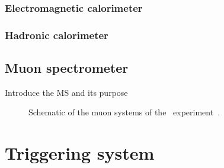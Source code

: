 \FloatBarrier
\subsubsection{Electromagnetic calorimeter} 

\FloatBarrier
\subsubsection{Hadronic calorimeter} 

\FloatBarrier
\subsection{Muon spectrometer} 

{\color{red} Introduce the MS and its purpose}

\begin{figure}[ht]
  \caption{
    Schematic of the muon systems of the
    \atlas\ experiment~\cite{Pequenao:1095929}.
  }
  \label{fig:ms_cartoon}
\end{figure}


\FloatBarrier
\section{Triggering system}

